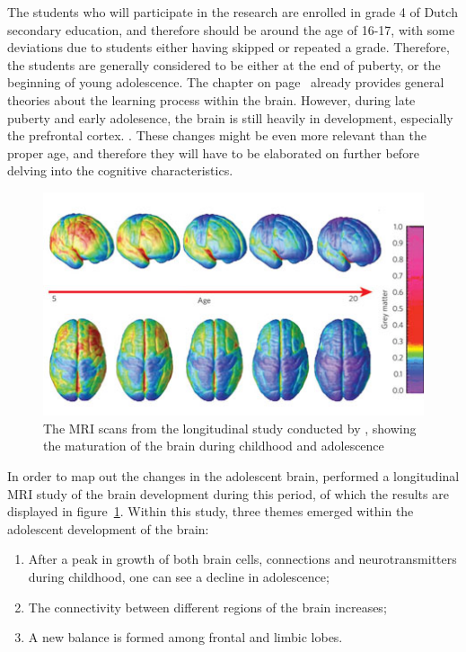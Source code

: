 The students who will participate in the research are enrolled in grade 4 of Dutch secondary education, and therefore should be around the age of 16-17, with some deviations due to students either having skipped or repeated a grade. Therefore, the students are generally considered to be either at the end of puberty, or the beginning of young adolescence. The  chapter on page~\pageref{ch:theory} already provides general theories about the learning process within the brain. However, during late puberty and early adolesence, the brain is still heavily in development, especially the prefrontal cortex. \cite{blakemore}. These changes might be even more relevant than the proper age, and therefore they will have to be elaborated on further before delving into the cognitive characteristics.

\begin{figure}
    \centering
    \includegraphics[width=.7\textwidth]{img/braindevelopment.png}
    \caption{The MRI scans from the longitudinal study conducted by \protect{}, showing the maturation of the brain during childhood and adolescence}
    \label{fig:braindevelopment}
\end{figure}

In order to map out the changes in the adolescent brain,  performed a longitudinal MRI study of the brain development during this period, of which the results are displayed in figure~\ref{fig:braindevelopment}. Within this study, three themes emerged within the adolescent development of the brain:

\begin{enumerate}
    \item After a peak in growth of both brain cells, connections and neurotransmitters during childhood, one can see a decline in adolescence;
    \item The connectivity between different regions of the brain increases;
    \item A new balance is formed among frontal and limbic lobes.
\end{enumerate}

